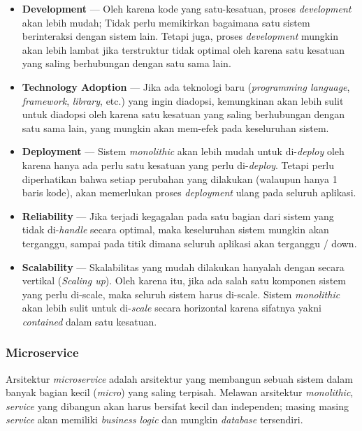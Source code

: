 \documentclass[
	11pt, %
	indonesian
]{assignment}
\begin{document}
\begin{itemize}
	\item \textbf{Development} --- Oleh karena kode yang satu-kesatuan, proses \textit{development} akan lebih mudah; Tidak perlu memikirkan bagaimana satu sistem berinteraksi dengan sistem lain. Tetapi juga, proses \textit{development} mungkin akan lebih lambat jika terstruktur tidak optimal oleh karena satu kesatuan yang saling berhubungan dengan satu sama lain.
	\item \textbf{Technology Adoption} --- Jika ada teknologi baru (\textit{programming language}, \textit{framework}, \textit{library}, etc.) yang ingin diadopsi, kemungkinan akan lebih sulit untuk diadopsi oleh karena satu kesatuan yang saling berhubungan dengan satu sama lain, yang mungkin akan mem-efek pada keseluruhan sistem.
	\item \textbf{Deployment} --- Sistem \textit{monolithic} akan lebih mudah untuk di-\textit{deploy} oleh karena hanya ada perlu satu kesatuan yang perlu di-\textit{deploy}. Tetapi perlu diperhatikan bahwa setiap perubahan yang dilakukan (walaupun hanya 1 baris kode), akan memerlukan proses \textit{deployment} ulang pada seluruh aplikasi.
	\item \textbf{Reliability} --- Jika terjadi kegagalan pada satu bagian dari sistem yang tidak di-\textit{handle} secara optimal, maka keseluruhan sistem mungkin akan terganggu, sampai pada titik dimana seluruh aplikasi akan terganggu / down.
	\item \textbf{Scalability} --- Skalabilitas yang mudah dilakukan hanyalah dengan secara vertikal (\textit{Scaling up}). Oleh karena itu, jika ada salah satu komponen sistem yang perlu di-scale, maka seluruh sistem harus di-scale. Sistem \textit{monolithic} akan lebih sulit untuk di-\textit{scale} secara horizontal karena sifatnya yakni \textit{contained} dalam satu kesatuan.
\end{itemize}

\subsubsection*{Microservice}

Arsitektur \textit{microservice} adalah arsitektur yang membangun sebuah sistem dalam banyak bagian kecil (\textit{micro}) yang saling terpisah. Melawan arsitektur \textit{monolithic}, \textit{service} yang dibangun akan harus bersifat kecil dan independen; masing masing \textit{service} akan memiliki \textit{business logic} dan mungkin \textit{database} tersendiri.
\end{document}
